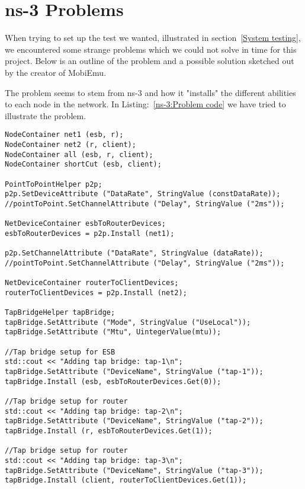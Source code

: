 \section{ns-3 Problems}\label{ns-3 Problems}
	When trying to set up the test we wanted, illustrated in section~\ref{System testing}, we encountered some strange problems which we could not solve in time for this project. Below is an outline of the problem and a possible solution sketched out by the creator of \gls{MobiEmu}.
	
	The problem seems to stem from ns-3 and how it "installs" the different abilities to each node in the network. In Listing:~\ref{ns-3:Problem code} we have tried to illustrate the problem.
	
\lstset{language=C++, style=eclipse}
\begin{lstlisting}[frame=single, caption={This code snippet does not work}, label=ns-3:Problem code, breaklines=true]
NodeContainer net1 (esb, r);
NodeContainer net2 (r, client);
NodeContainer all (esb, r, client);
NodeContainer shortCut (esb, client);

PointToPointHelper p2p;
p2p.SetDeviceAttribute ("DataRate", StringValue (constDataRate));
//pointToPoint.SetChannelAttribute ("Delay", StringValue ("2ms"));

NetDeviceContainer esbToRouterDevices;
esbToRouterDevices = p2p.Install (net1);

p2p.SetChannelAttribute ("DataRate", StringValue (dataRate));
//pointToPoint.SetChannelAttribute ("Delay", StringValue ("2ms"));

NetDeviceContainer routerToClientDevices;
routerToClientDevices = p2p.Install (net2);

TapBridgeHelper tapBridge;
tapBridge.SetAttribute ("Mode", StringValue ("UseLocal"));
tapBridge.SetAttribute ("Mtu", UintegerValue(mtu)); 

//Tap bridge setup for ESB
std::cout << "Adding tap bridge: tap-1\n";
tapBridge.SetAttribute ("DeviceName", StringValue ("tap-1"));
tapBridge.Install (esb, esbToRouterDevices.Get(0));

//Tap bridge setup for router
std::cout << "Adding tap bridge: tap-2\n";
tapBridge.SetAttribute ("DeviceName", StringValue ("tap-2"));
tapBridge.Install (r, esbToRouterDevices.Get(1));

//Tap bridge setup for router
std::cout << "Adding tap bridge: tap-3\n";
tapBridge.SetAttribute ("DeviceName", StringValue ("tap-3"));
tapBridge.Install (client, routerToClientDevices.Get(1));
\end{lstlisting}
	
